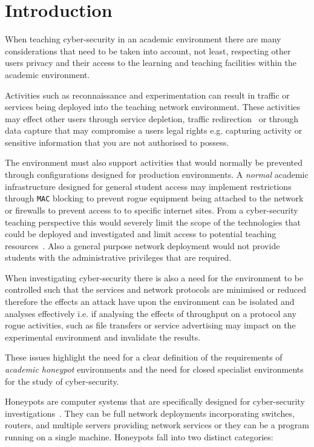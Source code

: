 \section{Introduction}\label{intro}
When teaching cyber-security in an academic environment there are many considerations that need to be taken into account, not least, respecting other users privacy and their access to the learning and teaching facilities within the academic environment.

Activities such as reconnaissance and experimentation can result in traffic or services being deployed into the teaching network environment. These activities may effect other users through service depletion, traffic redirection~\cite{LR:06,ACGO:06} or through data capture that may compromise a users legal rights e.g. capturing activity or sensitive information that you are not authorised to possess.

The environment must also support activities that would normally be prevented through configurations designed for production environments. A \emph{normal} academic infrastructure designed for general student access may implement restrictions through \texttt{MAC} blocking to prevent rogue equipment being attached to the network or firewalls to prevent access to to specific internet sites. From a cyber-security teaching perspective this would severely limit the scope of the technologies that could be deployed and investigated and limit access to potential teaching resources~\cite{ACGO:06,YYLCHJ:04}. Also a general purpose network deployment would not provide students with the administrative privileges that are required.

When investigating cyber-security there is also a need for the environment to be controlled such that the services and network protocols are minimised or reduced  therefore the effects an attack have upon the environment can be isolated and analyses effectively i.e. if analysing the effects of throughput on a protocol any rogue activities, such as file transfers or service advertising may impact on the experimental environment and invalidate the results.

These issues highlight the need for a clear definition of the requirements of \emph{academic honeypot} environments and the need for closed specialist environments for the study of cyber-security.

Honeypots are computer systems that are specifically designed for cyber-security investigations~\cite{FKAS:17,BCF:12,ZZQL:03}. They can be full network deployments incorporating switches, routers, and multiple servers providing network services or they can be a program running on a single machine. Honeypots fall into two distinct categories: 

